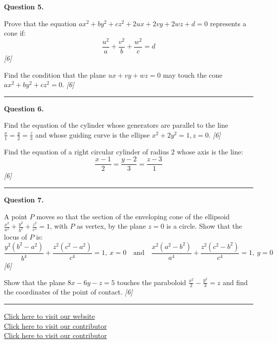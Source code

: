 \documentclass[11pt,a4paper]{article}
\newcommand{\pts}[1]{\hfill   \textit{[#1]}}
\begin{document}
\noindent   \textbf{Question 5.}

\begin{parts}
  \item Prove that the equation $a x^2 + b y^2 + c z^2 + 2ux + 2vy + 2wz + d = 0$ represents a cone if:
  \[
  \frac{u^2}{a} + \frac{v^2}{b} + \frac{w^2}{c} = d
  \] \pts{6}
  \item Find the condition that the plane $ux + vy + wz = 0$ may touch the cone $a x^2 + b y^2 + c z^2 = 0$. \pts{6}
\end{parts}

\medskip\rule{\linewidth}{0.2pt}

\medskip


\noindent   \textbf{Question 6.}

\begin{parts}
  \item Find the equation of the cylinder whose generators are parallel to the line $\frac{x}{1} = \frac{y}{2} = \frac{z}{3}$ and whose guiding curve is the ellipse $x^2 + 2y^2 = 1, z = 0$. \pts{6}
  \item Find the equation of a right circular cylinder of radius $2$ whose axis is the line:
  \[
  \frac{x-1}{2} = \frac{y-2}{3} = \frac{z-3}{1}
  \] \pts{6}
\end{parts}

\medskip\rule{\linewidth}{0.2pt}

\medskip


\noindent   \textbf{Question 7.}

\begin{parts}
  \item A point $P$ moves so that the section of the enveloping cone of the ellipsoid $\frac{x^2}{a^2} + \frac{y^2}{b^2} + \frac{z^2}{c^2} = 1$, with $P$ as vertex, by the plane $z = 0$ is a circle. Show that the locus of $P$ is:
  \[
  \frac{y^2(b^2-a^2)}{b^4} + \frac{z^2(c^2-a^2)}{c^4} = 1, \ x = 0 \quad  \text{and} \quad \frac{x^2(a^2-b^2)}{a^4} + \frac{z^2(c^2-b^2)}{c^4} = 1, \ y = 0
  \] \pts{6}
  \item Show that the plane $8x - 6y - z = 5$ touches the paraboloid $\frac{x^2}{2} - \frac{y^2}{3} = z$ and find the coordinates of the point of contact. \pts{6}
\end{parts}

\vfill
\rule{\linewidth}{0.4pt}

\begin{center}\small
  \href{https://bhu-exam.vercel.app/}{Click here to visit our website}\\[4pt]
  \href{https://me-aryan.vercel.app/}{Click here to visit our contributor}\\[4pt]
  \href{https://quashan-me.vercel.app/}{Click here to visit our contributor}
\end{center}
\end{document}
